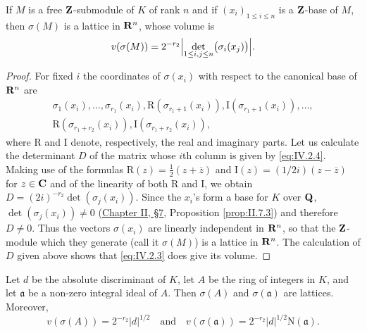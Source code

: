 \begin{proposition}
\label{prop:IV.2.1}
If $M$ is a free $\mathbf{Z}$-submodule of $K$ of rank $n$ and if
$(x_{i})_{1\leq i\leq n}$ is a $\mathbf{Z}$-base of $M$, then $\sigma(M)$ is a
lattice in $\mathbf{R}^{n}$, whose volume is
\begin{equation}
v(\sigma(M))=2^{-r_{2}}
\Bigl|\det_{1\leq i,j\leq n}\bigl(\sigma_{i}(x_{j})\bigr)\Bigr|.
\label{eq:IV.2.3}
\end{equation}
\end{proposition}

\begin{proof}
For fixed $i$ the coordinates of $\sigma(x_{i})$ with respect to the
canonical base of $\mathbf{R}^{n}$ are
\begin{equation}
\begin{gathered}
\sigma_{1}(x_{i}),\ldots,\sigma_{r_{1}}(x_{i}),
\mathrm{R}(\sigma_{r_{1}+1}(x_{i})),\mathrm{I}(\sigma_{r_{1}+1}(x_{i})),\ldots,\\
\mathrm{R}(\sigma_{r_{1}+r_{2}}(x_{i})),\mathrm{I}(\sigma_{r_{1}+r_{2}}(x_{i})),
\end{gathered}
\label{eq:IV.2.4}
\end{equation}
where $\mathrm{R}$ and $\mathrm{I}$ denote, respectively, the real and
imaginary parts. Let us calculate the determinant $D$ of the matrix whose
$i$th column is given by \eqref{eq:IV.2.4}. Making use of the formulas
$\mathrm{R}(z)=\frac{1}{2}(z+\overline{z})$ and
$\mathrm{I}(z)=(1/2i)(z-\overline{z})$ for $z\in\mathbf{C}$ and of the linearity
of both $\mathrm{R}$ and $\mathrm{I}$, we obtain
$D=(2i)^{-r_{2}}\det(\sigma_{j}(x_{i}))$. Since the
$x_{i}$'s form a base for $K$ over $\mathbf{Q}$, $\det(\sigma_{j}(x_{i}))\neq0$
(\hyperref[sec:2.7]{Chapter II, §7}, Proposition \ref{prop:II.7.3}) and therefore $D\neq0$. Thus
the vectors $\sigma(x_{i})$ are linearly independent in $\mathbf{R}^{n}$, so that
the $\mathbf{Z}$-module which they generate (call it $\sigma(M)$) is a lattice in
$\mathbf{R}^{n}$. The calculation of $D$ given above shows that \eqref{eq:IV.2.3}
does give its volume.
\end{proof}

\begin{proposition}
\label{prop:IV.2.2}
Let $d$ be the absolute discriminant of $K$, let $A$ be the ring of integers
in $K$, and let $\mathfrak{a}$ be a non-zero integral ideal of $A$. Then
$\sigma(A)$ and $\sigma(\mathfrak{a})$ are lattices. Moreover,
\begin{equation}
v(\sigma(A))=2^{-r_{2}}|d|^{1/2}\quad\text{and}\quad
v(\sigma(\mathfrak{a}))=2^{-r_{2}}|d|^{1/2}\mathrm{N}(\mathfrak{a}).
\label{eq:IV.2.5}
\end{equation}
\end{proposition}

